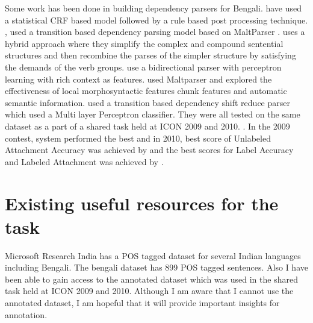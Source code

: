 \documentclass[11pt,letterpaper]{article}
\begin{document}
Some work has been done in building dependency parsers for Bengali. \citep{ghosh2009dependency} have used a statistical CRF based model followed by a rule based post processing technique. \citep{Nivre_parsingindian}, \citep{ambati_09} used a transition based dependency parsing model based on MaltParser \citep{Nivre05maltparser:a}. \citep{De_Dep_ben} uses a hybrid approach where they simplify the complex and compound sentential structures and then recombine the parses of the simpler structure by satisfying the demands of the verb groups. \citep{bidir_parser} use a bidirectional parser with perceptron learning with rich context as features. \citep{kosaraju_10} used Maltparser and explored the effectiveness of local morphosyntactic features chunk features and automatic semantic information. \citep{attardi_10} used a transition based dependency shift reduce parser which used a Multi layer Perceptron classifier. They were all tested on the same dataset as a part of a shared task held at ICON 2009 and 2010. \citep{husain_09, husain_10}. In the 2009 contest, \citep{ambati_09} system performed the best and in 2010, best score of Unlabeled Attachment Accuracy was achieved by \citep{attardi_10} and the best scores for Label Accuracy and Labeled Attachment was achieved by  \citep{kosaraju_10}.

\section{Existing useful resources for the task}
Microsoft Research India has a POS tagged dataset for several Indian languages including Bengali. The bengali dataset has 899 POS tagged sentences. Also I have been able to gain access to the annotated dataset which was used in the shared task held at ICON 2009 and 2010. Although I am aware that I cannot use the annotated dataset, I am hopeful that it will provide important insights for annotation.
\end{document}
